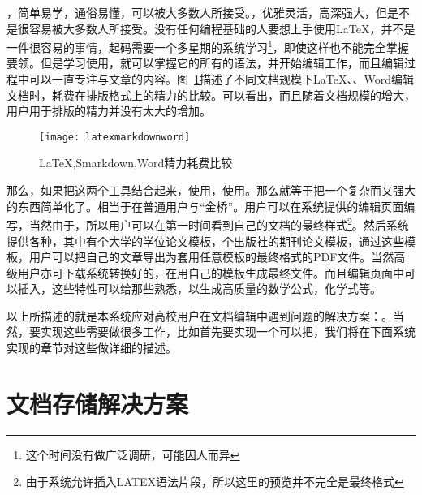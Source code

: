 ，简单易学，通俗易懂，可以被大多数人所接受。，优雅灵活，高深强大，但是不是很容易被大多数人所接受。没有任何编程基础的人要想上手使用\LaTeX，并不是一件很容易的事情，起码需要一个多星期的系统学习\footnote{这个时间没有做广泛调研，可能因人而异}，即使这样也不能完全掌握要领。但是学习使用，就可以掌握它的所有的语法，并开始编辑工作，而且编辑过程中可以一直专注与文章的内容。图~\ref{fig:xfig7}描述了不同文档规模下\LaTeX、\smarkdown、Word编辑文档时，耗费在排版格式上的精力的比较。可以看出，而且随着文档规模的增大，用户用于排版的精力并没有太大的增加。
\begin{figure}[H]
  \centering
  \texttt{[image: latexmarkdownword]}
  \caption{LaTeX,Smarkdown,Word精力耗费比较}
  \label{fig:xfig7}
\end{figure}
那么，如果把这两个工具结合起来，使用，使用。那么就等于把一个复杂而又强大的东西简单化了。相当于在普通用户与“金桥”。用户可以在系统提供的编辑页面编写，当然由于，所以用户可以在第一时间看到自己的文档的最终样式\footnote{由于系统允许插入LATEX语法片段，所以这里的预览并不完全是最终格式}。然后系统提供各种，其中有个大学的学位论文模板，个出版社的期刊论文模板，通过这些模板，用户可以把自己的文章导出为套用任意模板的最终格式的PDF文件。当然高级用户亦可下载系统转换好的，在用自己的模板生成最终文件。而且编辑页面中可以插入，这些特性可以给那些熟悉，以生成高质量的数学公式，化学式等。

以上所描述的就是本系统应对高校用户在文档编辑中遇到问题的解决方案：。当然，要实现这些需要做很多工作，比如首先要实现一个可以把，我们将在下面系统实现的章节对这些做详细的描述。


\section{文档存储解决方案}
\label{sec:save}

